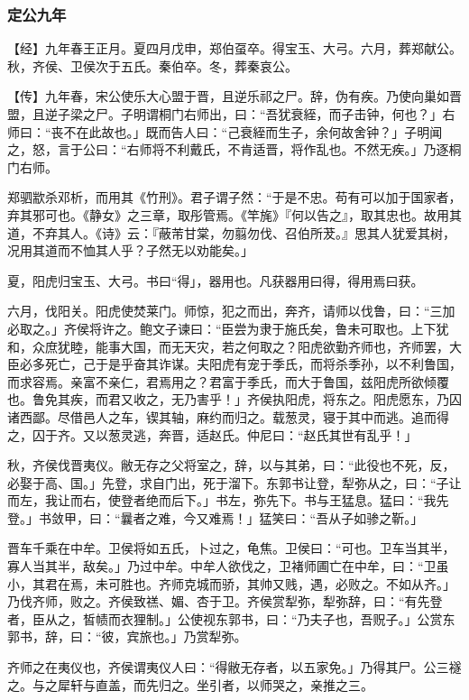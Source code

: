 \documentclass[]{article}
\begin{document}
\hypertarget{header-n2971}{%
\subsubsection{定公九年}\label{header-n2971}}

【经】九年春王正月。夏四月戊申，郑伯虿卒。得宝玉、大弓。六月，葬郑献公。秋，齐侯、卫侯次于五氏。秦伯卒。冬，葬秦哀公。

【传】九年春，宋公使乐大心盟于晋，且逆乐祁之尸。辞，伪有疾。乃使向巢如晋盟，且逆子梁之尸。子明谓桐门右师出，曰：``吾犹衰絰，而子击钟，何也？」右师曰：``丧不在此故也。」既而告人曰：``己衰絰而生子，余何故舍钟？」子明闻之，怒，言于公曰：``右师将不利戴氏，不肯适晋，将作乱也。不然无疾。」乃逐桐门右师。

郑驷歂杀邓析，而用其《竹刑》。君子谓子然：``于是不忠。苟有可以加于国家者，弃其邪可也。《静女》之三章，取彤管焉。《竿旄》『何以告之』，取其忠也。故用其道，不弃其人。《诗》云：『蔽芾甘棠，勿翦勿伐、召伯所茇。』思其人犹爱其树，况用其道而不恤其人乎？子然无以劝能矣。」

夏，阳虎归宝玉、大弓。书曰``得」，器用也。凡获器用曰得，得用焉曰获。

六月，伐阳关。阳虎使焚莱门。师惊，犯之而出，奔齐，请师以伐鲁，曰：``三加必取之。」齐侯将许之。鲍文子谏曰：``臣尝为隶于施氏矣，鲁未可取也。上下犹和，众庶犹睦，能事大国，而无天灾，若之何取之？阳虎欲勤齐师也，齐师罢，大臣必多死亡，己于是乎奋其诈谋。夫阳虎有宠于季氏，而将杀季孙，以不利鲁国，而求容焉。亲富不亲仁，君焉用之？君富于季氏，而大于鲁国，兹阳虎所欲倾覆也。鲁免其疾，而君又收之，无乃害乎！」齐侯执阳虎，将东之。阳虎愿东，乃囚诸西鄙。尽借邑人之车，锲其轴，麻约而归之。载葱灵，寝于其中而逃。追而得之，囚于齐。又以葱灵逃，奔晋，适赵氏。仲尼曰：``赵氏其世有乱乎！」

秋，齐侯伐晋夷仪。敝无存之父将室之，辞，以与其弟，曰：``此役也不死，反，必娶于高、国。」先登，求自门出，死于溜下。东郭书让登，犁弥从之，曰：``子让而左，我让而右，使登者绝而后下。」书左，弥先下。书与王猛息。猛曰：``我先登。」书敛甲，曰：``曩者之难，今又难焉！」猛笑曰：``吾从子如骖之靳。」

晋车千乘在中牟。卫侯将如五氏，卜过之，龟焦。卫侯曰：``可也。卫车当其半，寡人当其半，敌矣。」乃过中牟。中牟人欲伐之，卫褚师圃亡在中牟，曰：``卫虽小，其君在焉，未可胜也。齐师克城而骄，其帅又贱，遇，必败之。不如从齐。」乃伐齐师，败之。齐侯致禚、媚、杏于卫。齐侯赏犁弥，犁弥辞，曰：``有先登者，臣从之，皙帻而衣狸制。」公使视东郭书，曰：``乃夫子也，吾贶子。」公赏东郭书，辞，曰：``彼，宾旅也。」乃赏犁弥。

齐师之在夷仪也，齐侯谓夷仪人曰：``得敝无存者，以五家免。」乃得其尸。公三襚之。与之犀轩与直盖，而先归之。坐引者，以师哭之，亲推之三。
\end{document}
